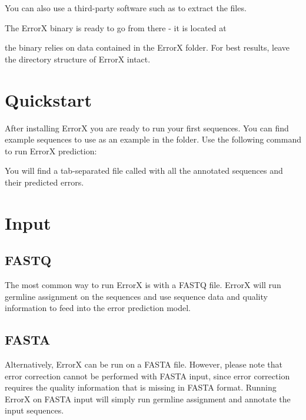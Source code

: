 \documentclass[letterpaper,10pt,english]{sphinxmanual}
\begin{document}
You can also use a third-party software such as  to extract the files.

The ErrorX binary is ready to go from there - it is located at 

 the binary relies on data contained in the ErrorX folder. For best results, leave the directory structure of ErrorX intact.


\chapter{Quickstart}
\label{\detokenize{index:quickstart}}
After installing ErrorX you are ready to run your first sequences. You can find example sequences to use as an example in the  folder. Use the following command to run ErrorX prediction:


You will find a tab-separated file called  with all the annotated sequences and their predicted errors.


\chapter{Input}
\label{\detokenize{index:input}}

\section{FASTQ}
\label{\detokenize{index:fastq}}
The most common way to run ErrorX is with a FASTQ file. ErrorX will run germline assignment on the sequences and use sequence data and quality information to feed into the error prediction model.


\section{FASTA}
\label{\detokenize{index:fasta}}
Alternatively, ErrorX can be run on a FASTA file. However, please note that error correction cannot be performed with FASTA input, since error correction requires the quality information that is missing in FASTA format. Running ErrorX on FASTA input will simply run germline assignment and annotate the input sequences.
\end{document}
